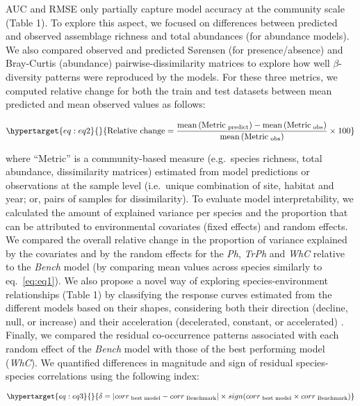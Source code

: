 \documentclass[9pt,biorxiv,doublespacing,lineno]{lapreprint}
\begin{document}
AUC and RMSE only partially capture model accuracy at the community
scale (Table 1). To explore this aspect, we focused on differences
between predicted and observed assemblage richness and total abundances
(for abundance models). We also compared observed and predicted Sørensen
(for presence/absence) and Bray-Curtis (abundance)
pairwise-dissimilarity matrices to explore how well \(\beta\)-diversity
patterns were reproduced by the models. For these three metrics, we
computed relative change for both the train and test datasets between
mean predicted and mean observed values as follows:

\begin{equation}\protect\hypertarget{eq:eq2}{}{\text{Relative change} = \frac{\text{mean}\left(\text{Metric}_{\text{ predict}}\right) - \text{mean}\left(\text{Metric}_{\text{ obs}}\right)}{\text{mean}\left(\text{Metric}_{\text{ obs}}\right)} \times 100}\label{eq:eq2}\end{equation}

where ``Metric'' is a community-based measure (e.g.~species richness,
total abundance, dissimilarity matrices) estimated from model
predictions or observations at the sample level (i.e.~unique combination
of site, habitat and year; or, pairs of samples for dissimilarity). To
evaluate model interpretability, we calculated the amount of explained
variance per species and the proportion that can be attributed to
environmental covariates (fixed effects) and random effects. We compared
the overall relative change in the proportion of variance explained by
the covariates and by the random effects for the \emph{Ph}, \emph{TrPh}
and \emph{WhC} relative to the \emph{Bench} model (by comparing mean
values across species similarly to eq.~\ref{eq:eq1}). We also propose a
novel way of exploring species-environment relationships (Table 1) by
classifying the response curves estimated from the different models
based on their shapes, considering both their direction (decline, null,
or increase) and their acceleration (decelerated, constant, or
accelerated) \autocite{Rigal_2020}. Finally, we compared the residual
co-occurrence patterns associated with each random effect of the
\emph{Bench} model with those of the best performing model (\emph{WhC}).
We quantified differences in magnitude and sign of residual
species-species correlations using the following index:

\begin{equation}\protect\hypertarget{eq:eq3}{}{\delta = |corr_{\text{ best model}} - corr_{\text{ Benchmark}}| \times sign(corr_{\text{ best model}} \times corr_{\text{ Benchmark}})}\label{eq:eq3}\end{equation}
\end{document}

